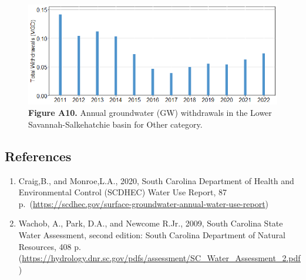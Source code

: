 \documentclass[
]{article}
\begin{document}
\begin{figure}[H]

{\centering \includegraphics{LSS_figures/trend-OT_bar-plot-1} 

}

\caption{\textbf{Figure A10.} Annual groundwater (GW) withdrawals in the Lower Savannah-Salkehatchie basin for Other category.}\label{fig:trend-OT_bar-plot}
\end{figure}

\newpage

\hypertarget{references}{%
\subsection{References}\label{references}}

\begin{enumerate}
\def\labelenumi{\arabic{enumi}.}
\item
  Craig,B., and Monroe,L.A., 2020, South Carolina Department of Health
  and Environmental Control (SCDHEC) Water Use Report, 87
  p.~(\url{https://scdhec.gov/surface-groundwater-annual-water-use-report})
\item
  Wachob, A., Park, D.A., and Newcome R.Jr., 2009, South Carolina State
  Water Assessment, second edition: South Carolina Department of Natural
  Resources, 408 p.
  (\url{https://hydrology.dnr.sc.gov/pdfs/assessment/SC_Water_Assessment_2.pdf})
\end{enumerate}
\end{document}
